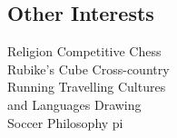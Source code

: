 \documentclass[letterpaper]{deedy-resume}
\begin{document}
\begin{minipage}[t]{0.33\textwidth}
\subsection{Other Interests}

Religion \textbullet{} Competitive Chess\\ \textbullet{} Rubike's Cube \textbullet{} Cross-country\\ Running \textbullet{} Travelling \textbullet{} Cultures\\ and Languages \textbullet{} Drawing\\ \textbullet{} Soccer \textbullet{} Philosophy \textbullet{} pi

\sectionspace 


\end{minipage}
\hfill
%
%
\end{document}
